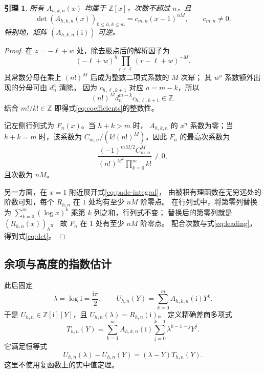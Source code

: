 \documentclass[UTF8,fontset=fandol,a4paper,11pt]{ctexart}
\newtheorem{lemma}[theorem]{引理}
\theoremstyle{remark}
\newcommand{\Z}{\mathbb Z}
\newcommand{\ii}{\mathrm i}
\numberwithin{equation}{section}
\begin{document}
\begin{lemma}\label{lem:integer-det}
所有 $A_{h,k,n}(x)$ 均属于 $\Z[x]$，次数不超过 $n$，且
\begin{equation}\label{eq:det}
\det(A_{h,k,n}(x))_{0\le h,k\le m}
 =c_{m,n}(x-1)^{nM},\qquad c_{m,n}\ne0.
\end{equation}
特别地，矩阵 $(A_{h,k,n}(\ii))$ 可逆。
\end{lemma}

\begin{proof}
在 $z=-\ell+w$ 处，除去极点后的解析因子为
\[
(-\ell+w)^h\prod_{r\ne\ell}(r-\ell+w)^{-M}.
\]
其常数分母在乘上 $(n!)^M$ 后成为整数二项式系数的 $M$ 次幂；
其 $w^a$ 系数额外出现的分母可由 $d_n^a$ 清除。
因为 $c_{h,\ell,k+1}$ 对应 $a=m-k$，所以
\[
(n!)^M d_n^{m-k}c_{h,\ell,k+1}\in\Z.
\]
结合 $m!/k!\in\Z$ 即得式\eqref{eq:coefficients}的整数性。

记左侧行列式为 $F_n(x)$。当 $h+k>m$ 时，
$A_{h,k,n}$ 的 $x^n$ 系数为零；当 $h+k=m$ 时，该系数为
$C_{m,n}/(k!(n!)^M)$。因此 $F_n$ 的最高次系数为
\begin{equation}\label{eq:leading}
\frac{(-1)^{mM/2}C_{m,n}^{M}}
 {(n!)^{M^2}\prod_{k=0}^{m}k!}\ne0,
\end{equation}
且次数为 $nM$。

另一方面，在 $x=1$ 附近展开式\eqref{eq:pade-integral}，
由被积有理函数在无穷远处的阶数可知，每个 $R_{h,n}$
在 $1$ 处均有至少 $nM$ 阶零点。
在行列式中，将第零列替换为
$\sum_{k=0}^{m}(\log x)^k$ 乘第 $k$ 列之和，行列式不变；
替换后的第零列就是 $(R_{h,n}(x))_h$。
故 $F_n$ 在 $1$ 处有至少 $nM$ 阶零点。
配合次数与式\eqref{eq:leading}，得到式\eqref{eq:det}。
\end{proof}

\subsection{余项与高度的指数估计}

此后固定
\[
\lambda=\log\ii=\frac{\ii\pi}{2},\qquad
U_{h,n}(Y)=\sum_{k=0}^{m}A_{h,k,n}(\ii)Y^k.
\]
于是 $U_{h,n}\in\Z[\ii][Y]$，且
$U_{h,n}(\lambda)=R_{h,n}(\ii)$。
定义精确差商多项式
\begin{equation}\label{eq:T}
T_{h,n}(Y)=\sum_{k=1}^{m}A_{h,k,n}(\ii)
                 \sum_{j=0}^{k-1}\lambda^{k-1-j}Y^j.
\end{equation}
它满足恒等式
\begin{equation}\label{eq:difference}
U_{h,n}(\lambda)-U_{h,n}(Y)
  =(\lambda-Y)T_{h,n}(Y).
\end{equation}
这里不使用复函数上的实中值定理。
\end{document}
